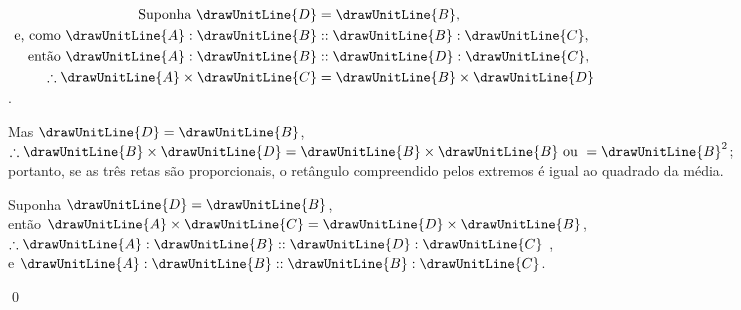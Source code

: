 \documentclass[booklanguage=brazilian]{byrnebook}
\begin{document}
\begin{center}
$\begin{aligned}
\mbox{ Suponha } \drawUnitLine{D} &= \drawUnitLine{B}, \\
\mbox{ e, como } \drawUnitLine{A} : \drawUnitLine{B} &:: \drawUnitLine{B} : \drawUnitLine{C}, \\
\mbox{ então } \drawUnitLine{A} : \drawUnitLine{B} &:: \drawUnitLine{D} : \drawUnitLine{C}, \\
\therefore \drawUnitLine{A} \times \drawUnitLine{C} &= \drawUnitLine{B} \times \drawUnitLine{D} \\
\end{aligned}$\\
.

Mas $\drawUnitLine{D} = \drawUnitLine{B}$,\\
$\therefore \drawUnitLine{B} \times \drawUnitLine{D} = \drawUnitLine{B} \times \drawUnitLine{B} \mbox{ ou } = \drawUnitLine{B}^2$;\\
portanto, se as três retas são proporcionais, o retângulo compreendido pelos extremos é igual ao quadrado da média.
\end{center}

\begin{center}
Suponha $\drawUnitLine{D} = \drawUnitLine{B}$,\\
então $\drawUnitLine{A} \times \drawUnitLine{C} = \drawUnitLine{D} \times \drawUnitLine{B}$,\\
$\therefore \drawUnitLine{A} : \drawUnitLine{B} :: \drawUnitLine{D} : \drawUnitLine{C}$ ,\\
e $\drawUnitLine{A} : \drawUnitLine{B} :: \drawUnitLine{B} : \drawUnitLine{C}$.
\end{center}

\qed
\end{document}
